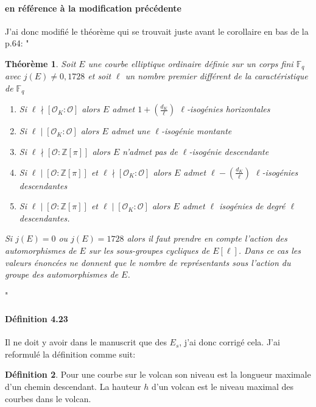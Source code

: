 \documentclass[10pt,a4paper]{article}
\theoremstyle{plain}
\newtheorem{thm}{Théorème}[section]
\theoremstyle{definition}
\theoremstyle{definition}
\theoremstyle{definition}
\theoremstyle{definition}
\theoremstyle{definition}
\newtheorem{defi}[thm]{Définition}
\theoremstyle{remark}
\theoremstyle{remark}
\theoremstyle{definition}
\begin{document}
\paragraph{ en référence à la modification précédente}{J'ai donc modifié le théorème qui se trouvait juste avant le corollaire en bas de la p.64: "\begin{thm}
\label{thm:Koh:cas}
Soit $E$ une courbe elliptique ordinaire définie sur un corps fini 
$\mathbb{F}_q$ avec $j(E)\neq 0, 1728$ et soit $\ell$ un nombre premier 
différent de la caractéristique de $\mathbb{F}_q$
\begin{enumerate}
\item Si $\ell \nmid [\mathcal{O}_K : \mathcal{O}]$ alors $E$ admet $ 1 + \left( \frac{d_K}{\ell} \right)$ $\ell$-isogénies horizontales
\item Si $\ell \mid [\mathcal{O}_K : \mathcal{O}]$ alors $E$ admet une $\ell$-isogénie montante
\item Si $\ell \nmid [\mathcal{O} : \mathbb{Z}[\pi]]$ alors $E$ n'admet pas de $\ell$-isogénie descendante
\item Si $\ell \mid [\mathcal{O} : \mathbb{Z}[\pi]]$ et $\ell \nmid [\mathcal{O}_K : \mathcal{O}]$ alors $E$ admet $\ell-\left( \frac{d_K}{\ell} \right)$ $\ell$-isogénies descendantes
\item  Si $\ell \mid [\mathcal{O} : \mathbb{Z}[\pi]]$ et $\ell \mid [\mathcal{O}_K : \mathcal{O}]$ alors $E$ admet $\ell$ isogénies de degré $\ell$ descendantes.
\end{enumerate}
Si $j(E)=0$ ou $j(E)=1728$ alors il faut prendre en compte l'action des 
automorphismes de $E$ sur les sous-groupes cycliques de $E[\ell]$. Dans ce cas
les valeurs énoncées ne donnent que le nombre de représentants 
sous l'action du groupe des automorphismes de $E$.
\end{thm}"}

\paragraph{Définition 4.23}{Il ne doit y avoir dans le manuscrit que des $E_s$, j'ai donc corrigé cela. J'ai reformulé la définition comme suit:
\begin{defi}
\label{def:haut:vol}
Pour une courbe sur le volcan son niveau est la longueur maximale d'un chemin descendant.
\newline
La hauteur $h$ d'un volcan est le niveau maximal des courbes dans le volcan.
\end{defi}}
\end{document}
